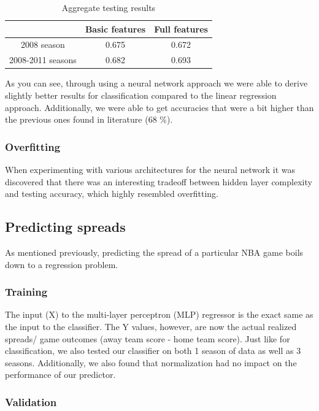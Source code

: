\documentclass{article}
\begin{document}
\begin{table}
  \begin{center}
    \begin{tabular}{ | c | c | c |}
      \hline
            &            	Basic features & 	Full features \\ \hline
	2008 season  &     	0.675 & 	0.672    \\ \hline
	2008-2011 seasons &   0.682&  0.693 \\ \hline


    \end{tabular}
  \end{center}
  \caption{Aggregate testing results}
\end{table}


As you can see, through using a neural network approach we were able to derive slightly better results for classification compared to the linear regression approach. Additionally, we were able to get accuracies that were a bit higher than the previous ones found in literature (68 \%).


\subsubsection{Overfitting}
When experimenting with various architectures for the neural network it was discovered that there was an interesting tradeoff between hidden layer complexity and testing accuracy, which highly resembled overfitting.

\subsection{Predicting spreads}
As mentioned previously, predicting the spread of a particular NBA game boils down to a regression problem.

\subsubsection{Training}
The input (X) to the multi-layer perceptron (MLP) regressor is the exact same as the input to the classifier. The Y values, however, are now the actual realized spreads/ game outcomes (away team score - home team score). Just like for classification, we also tested our classifier on both 1 season of data as well as 3 seasons. Additionally, we also found that normalization had no impact on the performance of our predictor.

\subsubsection{Validation}
\end{document}
